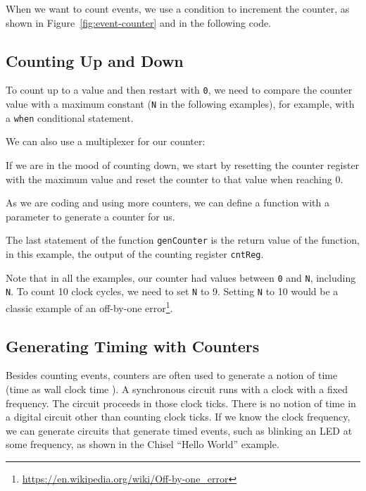 \documentclass[%
    10pt,
    headinclude, footexclude,
    openright, %
    notitlepage,
    cleardoubleempty,
    headsepline,
    pointlessnumbers,
    bibtotoc, idxtotoc,
    ]{scrbook}
\newcommand{\code}[1]{{\lstinline[basicstyle=\small\ttfamily]{#1}}}
\newcommand{\myref}[2]{\href{#1}{#2}}
\renewcommand{\myref}[2]{{#2}{\footnote{\url{#1}}}}
\begin{document}
\noindent When we want to count events, we use a condition to increment the counter,
as shown in Figure~\ref{fig:event-counter} and in the following code.


\subsection{Counting Up and Down}

To count up to a value and then restart with \code{0}, we need to compare
the counter value with a maximum constant (\code{N} in the following examples),
for example, with a \code{when} conditional statement.


\noindent We can also use a multiplexer for our counter:


\noindent If we are in the mood of counting down, we start by resetting the counter register
with the maximum value and reset the counter to that value when reaching 0.


\noindent As we are coding and using more counters, we can
define a function with a parameter to generate a counter for us.


\noindent The last statement of the function \code{genCounter} is the return
value of the function, in this example, the output of
the counting register \code{cntReg}.

Note that in all the examples, our counter had values between \code{0} and
\code{N}, including \code{N}. To count 10 clock cycles, we need
to set \code{N} to 9. Setting \code{N} to 10 would be a classic example of an
\myref{https://en.wikipedia.org/wiki/Off-by-one_error}{off-by-one error}.

\subsection{Generating Timing with Counters}
\label{sec:gen:timing}


Besides counting events, counters are often used to generate a notion of time
(time as wall clock time ).
A synchronous circuit runs with a clock with a fixed frequency.
The circuit proceeds in those clock ticks. There is no notion of time in a digital
circuit other than counting clock ticks. If we know the clock frequency, we
can generate circuits that generate timed events, such as blinking an LED
at some frequency, as shown in the Chisel ``Hello World'' example.
\end{document}
